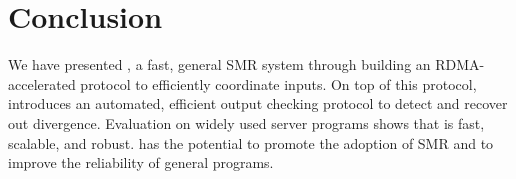 \section{Conclusion}\label{sec:conclusion}

We have presented \xxx, a fast, general SMR system 
through building an RDMA-accelerated \paxos protocol to efficiently coordinate 
inputs. On top of this protocol, \xxx introduces an automated, efficient output 
checking protocol to detect and recover out divergence. Evaluation on widely 
used server programs shows that \xxx is fast, scalable, and robust. 
\xxx has the potential to promote the adoption of SMR and to improve 
the reliability of general programs.
